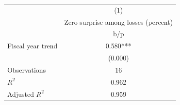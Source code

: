 {
\def\sym#1{\ifmmode^{#1}\else\(^{#1}\)\fi}
\begin{tabular}{l*{1}{c}}
\hline\hline
                    &\multicolumn{1}{c}{(1)}\\
                    &\multicolumn{1}{c}{Zero surprise among losses (percent)}\\
                    &         b/p   \\
\hline
Fiscal year trend   &       0.580***\\
                    &     (0.000)   \\
\hline
Observations        &          16   \\
\(R^{2}\)           &       0.962   \\
Adjusted \(R^{2}\)  &       0.959   \\
\hline\hline
\end{tabular}
}
